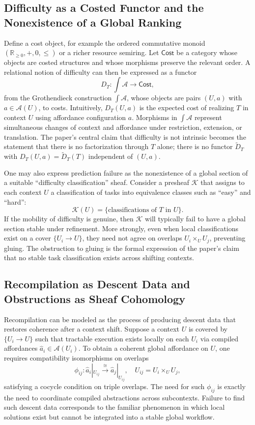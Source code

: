 \documentclass[12pt]{article}
\begin{document}
\subsection{Difficulty as a Costed Functor and the Nonexistence of a Global Ranking}

Define a cost object, for example the ordered commutative monoid $(\mathbb{R}_{\ge 0}, +, 0, \le)$ or a richer resource semiring. Let $\mathsf{Cost}$ be a category whose objects are costed structures and whose morphisms preserve the relevant order. A relational notion of difficulty can then be expressed as a functor
\[
D_T : \int \mathcal{A} \longrightarrow \mathsf{Cost},
\]
from the Grothendieck construction $\int\mathcal{A}$, whose objects are pairs $(U,a)$ with $a\in\mathcal{A}(U)$, to costs. Intuitively, $D_T(U,a)$ is the expected cost of realizing $T$ in context $U$ using affordance configuration $a$. Morphisms in $\int\mathcal{A}$ represent simultaneous changes of context and affordance under restriction, extension, or translation. The paper’s central claim that difficulty is not intrinsic becomes the statement that there is no factorization through $T$ alone; there is no functor $\widetilde{D}_T$ with $D_T(U,a)=\widetilde{D}_T(T)$ independent of $(U,a)$.

One may also express prediction failure as the nonexistence of a global section of a suitable ``difficulty classification'' sheaf. Consider a presheaf $\mathcal{K}$ that assigns to each context $U$ a classification of tasks into equivalence classes such as ``easy'' and ``hard'':
\[
\mathcal{K}(U) = \{\text{classifications of } T \text{ in } U\}.
\]
If the mobility of difficulty is genuine, then $\mathcal{K}$ will typically fail to have a global section stable under refinement. More strongly, even when local classifications exist on a cover $\{U_i\to U\}$, they need not agree on overlaps $U_i\times_U U_j$, preventing gluing. The obstruction to gluing is the formal expression of the paper’s claim that no stable task classification exists across shifting contexts.

\subsection{Recompilation as Descent Data and Obstructions as Sheaf Cohomology}

Recompilation can be modeled as the process of producing descent data that restores coherence after a context shift. Suppose a context $U$ is covered by $\{U_i\to U\}$ such that tractable execution exists locally on each $U_i$ via compiled affordances $\widehat{a}_i\in\mathcal{A}(U_i)$. To obtain a coherent global affordance on $U$, one requires compatibility isomorphisms on overlaps
\[
\phi_{ij} : \widehat{a}_i|_{U_{ij}} \xrightarrow{\cong} \widehat{a}_j|_{U_{ij}},
\quad U_{ij}=U_i\times_U U_j,
\]
satisfying a cocycle condition on triple overlaps. The need for such $\phi_{ij}$ is exactly the need to coordinate compiled abstractions across subcontexts. Failure to find such descent data corresponds to the familiar phenomenon in which local solutions exist but cannot be integrated into a stable global workflow.
\end{document}
